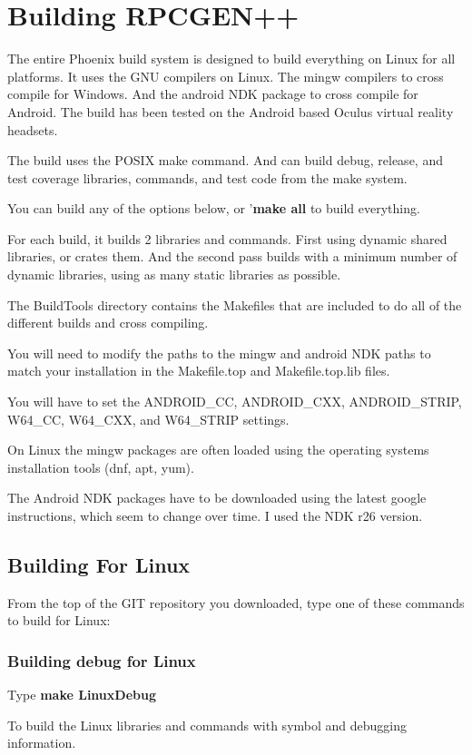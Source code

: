\section{Building RPCGEN++}
The entire Phoenix build system is designed to build everything
on Linux for all platforms.
It uses the GNU compilers on Linux.
The mingw compilers to cross compile for Windows.
And the android NDK package to cross compile for Android.
The build has been tested on the Android based Oculus virtual
reality headsets.

The build uses the POSIX make command.
And can build debug, release, and test coverage libraries,
commands, and test code from the make system.

You can build any of the options below, or '\textbf{make all}
to build everything.

For each build, it builds 2 libraries and commands.
First using dynamic shared libraries, or crates them.
And the second pass builds with a minimum number
of dynamic libraries, using as many static libraries
as possible.

The BuildTools directory contains the Makefiles
that are included to do all of the different builds
and cross compiling.

You will need to modify the paths to the mingw and
android NDK paths to match your installation in the
Makefile.top and Makefile.top.lib files.

You will have to set the ANDROID\_CC, ANDROID\_CXX, ANDROID\_STRIP,
W64\_CC, W64\_CXX, and W64\_STRIP settings.

On Linux the mingw packages are often loaded using the operating
systems installation tools (dnf, apt, yum).

The Android NDK packages have to be downloaded using the
latest google instructions, which seem to change over time.
I used the NDK r26 version.

\subsection{Building For Linux}
From the top of the GIT repository you downloaded,
type one of these commands to build for Linux:

\subsubsection{Building debug for Linux}
Type \textbf{make LinuxDebug}

To build the Linux libraries and commands with symbol
and debugging information.
  
